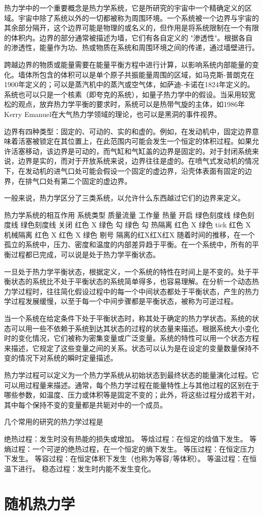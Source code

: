 热力学中的一个重要概念是热力学系统，它是所研究的宇宙中一个精确定义的区域。宇宙中除了系统以外的一切都被称为周围环境。一个系统被一个边界与宇宙的其余部分隔开，这个边界可能是物理的或名义的，但作用是将系统限制在一个有限的体积内。边界的部分通常被描述为墙，它们有各自定义的 "渗透性"。根据各自的渗透性，能量作为功、热或物质在系统和周围环境之间的传递，通过墙壁进行。

跨越边界的物质或能量需要在能量平衡方程中进行计算，以影响系统内部能量的变化。墙体所包含的体积可以是单个原子共振能量周围的区域，如马克斯-普朗克在1900年定义的；可以是蒸汽机中的蒸汽或空气体，如萨迪-卡诺在1824年定义的。系统也可以只是一个核素（即夸克的系统），如量子热力学中的假设。当采用较宽松的观点，放弃热力学平衡的要求时，系统可以是热带气旋的主体，如1986年Kerry Emanuel在大气热力学领域的理论，也可以是黑洞的事件视界。

边界有四种类型：固定的、可动的、实的和虚的。例如，在发动机中，固定边界意味着活塞被锁定在其位置上，在此范围内可能会发生一个恒定的体积过程。如果允许活塞移动，该边界是可动的，而气缸和气缸盖的边界是固定的。对于封闭系统来说，边界是实的，而对于开放系统来说，边界往往是虚的。在喷气式发动机的情况下，在发动机的进气口处可能会假设一个固定的虚边界，沿壳体表面有固定的边界，在排气口处有第二个固定的虚边界。

一般来说，热力学区分了三类系统，以允许什么东西越过它们的边界来定义。

热力学系统的相互作用
系统类型 质量流量 工作量 热量
开启 绿色刻度线 绿色刻度线 绿色刻度线
关闭 红色 X 绿色 勾 绿色 勾
热隔离 红色 X 绿色 tick 红色 X
机械隔离 红色 X 红色 X 绿色 剔号
隔离的红X红X红X
随着时间的推移，在一个孤立的系统中，压力、密度和温度的内部差异趋于平衡。在一个系统中，所有的平衡过程都已完成，可以说是处于热力学平衡状态。

一旦处于热力学平衡状态，根据定义，一个系统的特性在时间上是不变的。处于平衡状态的系统比不处于平衡状态的系统简单得多，也容易理解。在分析一个动态热力学过程时，往往简化假设过程中的每一个中间状态都处于平衡状态，产生的热力学过程发展缓慢，以至于每一个中间步骤都是平衡状态，被称为可逆过程。

当一个系统在给定条件下处于平衡状态时，称其处于确定的热力学状态。系统的状态可以用一些不依赖于系统到达其状态的过程的状态量来描述。根据系统大小变化时的变化情况，它们被称为密集变量或广泛变量。系统的特性可以用一个状态方程来描述，它规定了这些变量之间的关系。状态可以认为是在设定的变量数量保持不变的情况下对系统的瞬时定量描述。

热力学过程可以定义为一个热力学系统从初始状态到最终状态的能量演化过程。它可以用过程量来描述。通常，每个热力学过程在能量特性上与其他过程的区别在于哪些参数，如温度、压力或体积等是固定不变的；此外，将这些过程分成若干对，其中每个保持不变的变量都是共轭对中的一个成员。

几个常用的研究的热力学过程是

绝热过程：发生时没有热能的损失或增加。
等焓过程：在恒定的焓值下发生。
等熵过程：一个可逆的绝热过程，在一个恒定的熵下发生。
等压过程：在恒定压力下发生。
等容过程：在恒定体积下发生（也称为等容/等体积）。
等温过程：在恒温下进行。
稳态过程：发生时内能不发生变化。
\section{随机热力学}

